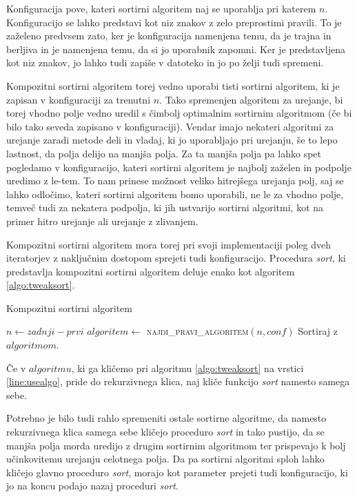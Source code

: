 \documentclass[a4paper,oneside,12pt]{article}
\begin{document}
Konfiguracija pove, kateri sortirni algoritem naj se uporablja pri
katerem $n$. Konfiguracijo se lahko predstavi kot niz znakov z zelo preprostimi
pravili. To je zaželeno predvsem zato, ker je konfiguracija namenjena temu, da je trajna
in berljiva in je namenjena temu, da si jo uporabnik zapomni. Ker je predstavljena kot niz
znakov, jo lahko tudi zapiše v datoteko in jo po želji tudi spremeni.

Kompozitni sortirni algoritem torej vedno uporabi tisti sortirni algoritem, ki je zapisan
v konfiguraciji za trenutni $n$. Tako spremenjen algoritem za urejanje, bi torej vhodno
polje vedno uredil s čimbolj optimalnim sortirnim algoritmom (če bi bilo tako seveda
zapisano v konfiguraciji). Vendar imajo nekateri algoritmi za urejanje zaradi metode deli in vladaj,
ki jo uporabljajo pri urejanju, še to lepo lastnost, da polja delijo na manjša polja. Za
ta manjša polja pa lahko spet pogledamo v konfiguracijo, kateri sortirni algoritem je
najbolj zaželen in podpolje uredimo z le-tem. To nam prinese možnost veliko hitrejšega
urejanja polj, saj se lahko odločimo, kateri sortirni algoritem bomo
uporabili, ne le za vhodno polje, temveč tudi za nekatera podpolja, ki jih ustvarijo
sortirni algoritmi, kot na primer hitro urejanje ali urejanje z zlivanjem.

Kompozitni sortirni algoritem mora torej pri svoji implementaciji poleg dveh 
iteratorjev z naključnim dostopom sprejeti tudi konfiguracijo. Procedura \emph{sort},
ki predstavlja kompozitni sortirni algoritem deluje enako kot algoritem
\ref{algo:tweaksort}. 

\begin{algorithm}
  \caption{Kompozitni sortirni algoritem}\label{algo:tweaksort}
  \begin{algorithmic}[1]
        \State $n \gets zadnji - prvi$
        \State $algoritem \gets$ \textsc{najdi\_pravi\_algoritem}$(n, conf)$
        \State \label{line:usealgo}Sortiraj z $algoritmom$.
    \EndFunction
  \end{algorithmic}
\end{algorithm}

Če v $algoritmu$, ki ga kličemo pri algoritmu \ref{algo:tweaksort} na vrstici
\ref{line:usealgo}, pride do rekurzivnega klica, naj kliče funkcijo \emph{sort} namesto
samega sebe.

Potrebno je bilo tudi rahlo spremeniti ostale sortirne algoritme, da namesto rekurzivnega
klica samega sebe kličejo proceduro \emph{sort} in tako pustijo, da se manjša polja morda uredijo z
drugim sortirnim algoritmom ter prispevajo k bolj učinkovitemu urejanju celotnega polja. Da pa
sortirni algoritmi sploh lahko kličejo glavno proceduro \emph{sort}, morajo kot
parameter prejeti tudi konfiguracijo, ki jo na koncu podajo nazaj proceduri \emph{sort}.
\end{document}

